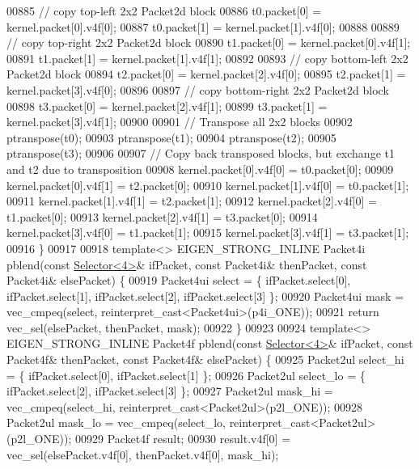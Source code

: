 \begin{DoxyCode}
{00885   \textcolor{comment}{// copy top-left 2x2 Packet2d block}
00886   t0.packet[0] = kernel.packet[0].v4f[0];
00887   t0.packet[1] = kernel.packet[1].v4f[0];
00888 
00889   \textcolor{comment}{// copy top-right 2x2 Packet2d block}
00890   t1.packet[0] = kernel.packet[0].v4f[1];
00891   t1.packet[1] = kernel.packet[1].v4f[1];
00892 
00893   \textcolor{comment}{// copy bottom-left 2x2 Packet2d block}
00894   t2.packet[0] = kernel.packet[2].v4f[0];
00895   t2.packet[1] = kernel.packet[3].v4f[0];
00896 
00897   \textcolor{comment}{// copy bottom-right 2x2 Packet2d block}
00898   t3.packet[0] = kernel.packet[2].v4f[1];
00899   t3.packet[1] = kernel.packet[3].v4f[1];
00900 
00901   \textcolor{comment}{// Transpose all 2x2 blocks}
00902   ptranspose(t0);
00903   ptranspose(t1);
00904   ptranspose(t2);
00905   ptranspose(t3);
00906 
00907   \textcolor{comment}{// Copy back transposed blocks, but exchange t1 and t2 due to transposition}
00908   kernel.packet[0].v4f[0] = t0.packet[0];
00909   kernel.packet[0].v4f[1] = t2.packet[0];
00910   kernel.packet[1].v4f[0] = t0.packet[1];
00911   kernel.packet[1].v4f[1] = t2.packet[1];
00912   kernel.packet[2].v4f[0] = t1.packet[0];
00913   kernel.packet[2].v4f[1] = t3.packet[0];
00914   kernel.packet[3].v4f[0] = t1.packet[1];
00915   kernel.packet[3].v4f[1] = t3.packet[1];
00916 \}
00917 
00918 \textcolor{keyword}{template}<> EIGEN\_STRONG\_INLINE Packet4i pblend(\textcolor{keyword}{const} \hyperlink{struct_eigen_1_1internal_1_1_selector}{Selector<4>}& ifPacket, \textcolor{keyword}{const} Packet4i& 
      thenPacket, \textcolor{keyword}{const} Packet4i& elsePacket) \{
00919   Packet4ui select = \{ ifPacket.select[0], ifPacket.select[1], ifPacket.select[2], ifPacket.select[3] \};
00920   Packet4ui mask = vec\_cmpeq(select, reinterpret\_cast<Packet4ui>(p4i\_ONE));
00921   \textcolor{keywordflow}{return} vec\_sel(elsePacket, thenPacket, mask);
00922 \}
00923 
00924 \textcolor{keyword}{template}<> EIGEN\_STRONG\_INLINE Packet4f pblend(\textcolor{keyword}{const} \hyperlink{struct_eigen_1_1internal_1_1_selector}{Selector<4>}& ifPacket, \textcolor{keyword}{const} Packet4f& 
      thenPacket, \textcolor{keyword}{const} Packet4f& elsePacket) \{
00925   Packet2ul select\_hi = \{ ifPacket.select[0], ifPacket.select[1] \};
00926   Packet2ul select\_lo = \{ ifPacket.select[2], ifPacket.select[3] \};
00927   Packet2ul mask\_hi = vec\_cmpeq(select\_hi, reinterpret\_cast<Packet2ul>(p2l\_ONE));
00928   Packet2ul mask\_lo = vec\_cmpeq(select\_lo, reinterpret\_cast<Packet2ul>(p2l\_ONE));
00929   Packet4f result;
00930   result.v4f[0] = vec\_sel(elsePacket.v4f[0], thenPacket.v4f[0], mask\_hi);
}
\end{DoxyCode}
